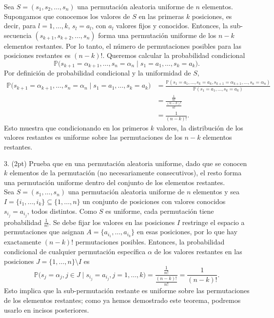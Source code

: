 Sea \( S = (s_1, s_2, \ldots, s_n) \) una permutación aleatoria uniforme de \( n \) elementos. Supongamos que conocemos los valores de \( S \) en las primeras \( k \) posiciones, es decir, para \( l = 1, \ldots, k \), \( s_l = a_l \), con \( a_l \) valores fijos y conocidos.
Entonces, la sub-secuencia \( (s_{k+1}, s_{k+2}, \ldots, s_n) \) forma una permutación uniforme de los \( n-k \) elementos restantes.
Por lo tanto, el número de permutaciones posibles para las posiciones restantes es \((n-k)!\).
Queremos calcular la probabilidad condicional
\[
\mathbb{P}\bigl(s_{k+1} = \alpha_{k+1}, \ldots, s_n = \alpha_n \mid s_1 = a_1, \ldots, s_k = a_k \bigr).
\]
Por definición de probabilidad condicional y la uniformidad de \( S \),
\[
\begin{aligned}
\mathbb{P}\bigl(s_{k+1} = \alpha_{k+1}, \ldots, s_n = \alpha_n \mid s_1 = a_1, \ldots, s_k = a_k\bigr)
&= \frac{\mathbb{P}\left(s_1 = a_1, \ldots, s_k = a_k, s_{k+1} = \alpha_{k+1}, \ldots, s_n = \alpha_n \right)}{\mathbb{P}\left(s_1 = a_1, \ldots, s_k = a_k \right)} \\
&= \frac{\frac{1}{n!}}{\frac{(n-k)!}{n!}} \\
&= \frac{1}{(n-k)!}.
\end{aligned}
\]
Esto muestra que condicionando en los primeros \( k \) valores, la distribución de los valores restantes es uniforme sobre las permutaciones de los \( n-k \) elementos restantes.\\

\QED

3. (2pt) Prueba que en una permutación aleatoria uniforme, dado que se conocen \( k \) elementos de la permutación (no necesariamente consecutivos), el resto forma una permutación uniforme dentro del conjunto de los elementos restantes. \\

Sea \( S = (s_1, \ldots, s_n) \) una permutación aleatoria uniforme de \( n \) elementos y sea \( I = \{i_1, \ldots, i_k\} \subseteq \{1, \ldots, n\} \) un conjunto de posiciones con valores conocidos \( s_{i_j} = a_{i_j} \), todos distintos. Como \( S \) es uniforme, cada permutación tiene probabilidad \( \frac{1}{n!} \).
Se debe fijar los valores en las posiciones \( I \) restringe el espacio a permutaciones que asignan \( A = \{a_{i_1}, \ldots, a_{i_k}\} \) en esas posiciones, por lo que hay exactamente \((n-k)!\) permutaciones posibles. Entonces, la probabilidad condicional de cualquier permutación específica \( \alpha \) de los valores restantes en las posiciones \( J = \{1, \ldots, n\} \setminus I \) es
\[
\mathbb{P}\bigl(s_j = \alpha_j, j \in J \mid s_{i_j} = a_{i_j}, j=1,\ldots,k\bigr) = \frac{\frac{1}{n!}}{\frac{(n-k)!}{n!}} = \frac{1}{(n-k)!}.
\]
Esto implica que la sub-permutación restante es uniforme sobre las permutaciones de los elementos restantes; como ya hemos demostrado este teorema, podremos usarlo en incisos posteriores.

